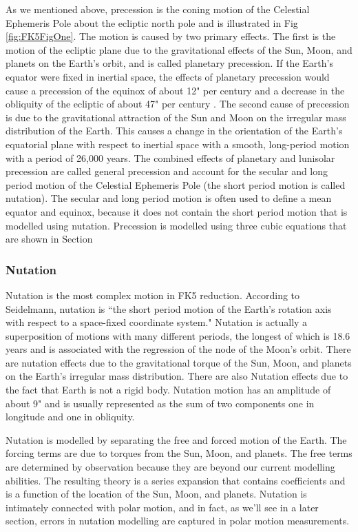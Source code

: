 As we mentioned above, precession is the coning motion of the
Celestial Ephemeris Pole about the ecliptic north pole and is
illustrated in Fig \ref{fig:FK5FigOne}. The motion is caused by two
primary effects. The first is the motion of the ecliptic plane due
to the gravitational effects of the Sun, Moon, and planets on the
Earth's orbit, and is called planetary precession. If the Earth's
equator were fixed in inertial space, the effects of planetary
precession would cause a precession of the equinox of about 12" per
century and a decrease in the obliquity of the ecliptic of about 47"
per century \cite{seidelmann}.  The second cause of precession is
due to the gravitational attraction of the Sun and Moon on the
irregular mass distribution of the Earth. This causes a change in
the orientation of the Earth's equatorial plane with respect to
inertial space with a smooth, long-period motion with a period of
26,000 years.  The combined effects of planetary and lunisolar
precession are called general precession and account for the secular
and long period motion of the Celestial Ephemeris Pole (the short
period motion is called nutation).   The secular and long
period motion is often used to define a mean equator and equinox,
because it does not contain the short period motion that is modelled
using nutation. Precession is modelled using three cubic equations
that are shown in Section %

\subsubsection{Nutation}

Nutation is the most complex motion in FK5 reduction.   According to
Seidelmann\cite{seidelmann}, nutation is ``the short period motion
of the Earth's rotation axis with respect to a space-fixed
coordinate system."  Nutation is actually a superposition of motions
with many different periods, the longest of which is 18.6 years and
is associated with the regression of the node of the Moon's orbit.
There are nutation effects due to the gravitational torque of the
Sun, Moon, and planets on the Earth's irregular mass distribution.
There are also Nutation effects due to the fact that Earth is not a
rigid body.  Nutation motion has an amplitude of about 9" and is
usually represented as the sum of two components one in longitude
and one in obliquity.

Nutation is modelled by separating the free and forced motion of the
Earth. The forcing terms are due to torques from the Sun, Moon, and
planets.   The free terms are determined by observation because they
are beyond our current modelling abilities.   The resulting theory
is a series expansion that contains coefficients and is a function
of the location of the Sun, Moon, and planets.  Nutation is
intimately connected with polar motion, and in fact, as we'll see in
a later section, errors in nutation modelling are captured in polar
motion measurements.


